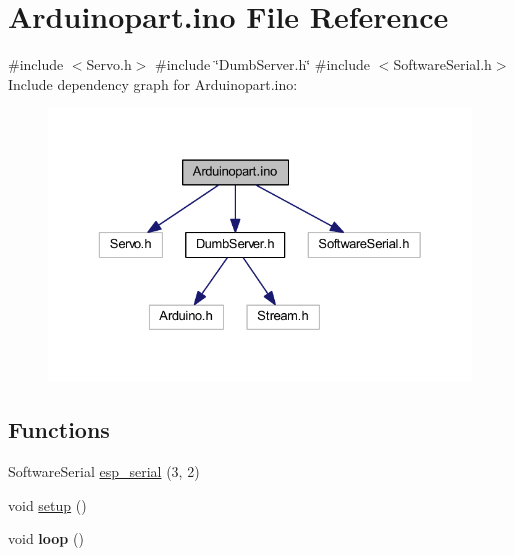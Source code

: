 \hypertarget{_arduinopart_8ino}{}\section{Arduinopart.\+ino File Reference}
\label{_arduinopart_8ino}
{\ttfamily \#include $<$Servo.\+h$>$}\newline
{\ttfamily \#include \char`\"{}Dumb\+Server.\+h\char`\"{}}\newline
{\ttfamily \#include $<$Software\+Serial.\+h$>$}\newline
Include dependency graph for Arduinopart.\+ino\+:\nopagebreak
\begin{figure}[H]
\begin{center}
\leavevmode
\includegraphics[width=329pt]{_arduinopart_8ino__incl}
\end{center}
\end{figure}
\subsection*{Functions}
\begin{DoxyCompactItemize}
\item 
Software\+Serial \mbox{\hyperlink{_arduinopart_8ino_af690b3a6882292855c4091ede8039998}{esp\+\_\+serial}} (3, 2)
\item 
void \mbox{\hyperlink{_arduinopart_8ino_a4fc01d736fe50cf5b977f755b675f11d}{setup}} ()
\item 
\mbox{\label{_arduinopart_8ino_afe461d27b9c48d5921c00d521181f12f}} 
void {\bfseries loop} ()
\end{DoxyCompactItemize}
